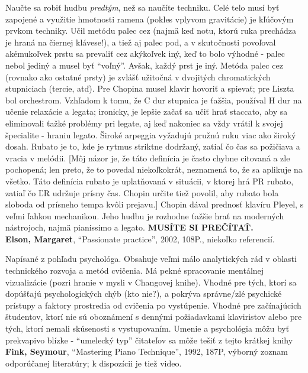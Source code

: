 \documentclass[11pt,a4paper]{book}
\begin{document}
Naučte sa robiť hudbu \textit{predtým}, než sa naučíte techniku. Celé telo musí byť zapojené a využitie hmotnosti ramena (pokles vplyvom gravitácie) je kľúčovým prvkom techniky. Učil metódu palec cez (najmä keď notu, ktorú ruka prechádza je hraná na čiernej klávese!), a tiež aj palec pod, a v skutočnosti povoľoval akémukoľvek prstu sa prevaliť cez akýkoľvek iný, keď to bolo výhodné - palec nebol jediný a musel byť “voľný”. Avšak, každý prst je iný. Metóda palec cez (rovnako ako ostatné prsty) je zvlášť užitočná v dvojitých chromatických stupniciach (tercie, atď). Pre Chopina musel klavir hovoriť a spievať; pre Liszta bol orchestrom. Vzhľadom k tomu, že C dur stupnica je ťažšia, používal H dur na učenie relaxácie a legata; ironicky, je lepšie začať sa učiť hrať staccato, aby sa eliminovali ťažké problémy pri legate, aj keď nakoniec sa vždy vrátil k svojej špecialite - hraniu legato. Široké arpeggia vyžadujú pružnú ruku viac ako široký dosah. Rubato je to, kde je rytmus striktne dodržaný, zatiaľ čo čas sa požičiava a vracia v melódii. [Môj názor je, že táto definícia je často chybne citovaná a zle pochopená; len preto, že to povedal niekoľkokrát, neznamená to, že sa aplikuje na všetko. Táto definícia rubato je uplatňovaná v situácii, v ktorej hrá PR rubato, zatiaľ čo ĽR udržuje prísny čas. Chopin určite tiež povolil, aby rubato bola sloboda od prísneho tempa kvôli prejavu.] Chopin dával prednosť klavíru Pleyel, s veľmi ľahkou mechanikou. Jeho hudbu je rozhodne ťažšie hrať na moderných nástrojoch, najmä pianissimo a legato. \textbf{MUSÍTE SI PREČÍTAŤ.}
\medskip\\
\textbf{Elson, Margaret}, “Passionate practice”, 2002, 108P., niekoľko referencií. 

Napísané z pohľadu psychológa. Obsahuje veľmi málo analytických rád v oblasti technického rozvoja a metód cvičenia. Má pekné spracovanie mentálnej vizualizácie (pozri hranie v mysli v Changovej knihe). Vhodné pre tých, ktorí sa dopúšťajú psychologických chýb (kto nie?), a pokrýva správne/zlé psychické prístupy a faktory prostredia od cvičenia po vystúpenie. Vhodné pre začínajúcich študentov, ktorí nie sú oboznámení s dennými požiadavkami klaviristov alebo pre tých, ktorí nemali skúsenosti s vystupovaním. Umenie a psychológia môžu byť prekvapivo blízke - “umelecký typ” čitateľov sa môže tešiť z tejto krátkej knihy 
\medskip\\
\textbf{Fink, Seymour}, “Mastering Piano Technique”, 1992, 187P, výborný zoznam odporúčanej literatúry; k dispozícii je tiež video. 
\end{document}
